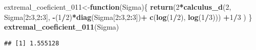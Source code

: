 \documentclass[
]{article}
\newenvironment{Shaded}{\begin{snugshade}}{\end{snugshade}}
\newcommand{\ControlFlowTok}[1]{\textcolor[rgb]{0.13,0.29,0.53}{\textbf{#1}}}
\newcommand{\DecValTok}[1]{\textcolor[rgb]{0.00,0.00,0.81}{#1}}
\newcommand{\FunctionTok}[1]{\textcolor[rgb]{0.13,0.29,0.53}{\textbf{#1}}}
\newcommand{\NormalTok}[1]{#1}
\newcommand{\OtherTok}[1]{\textcolor[rgb]{0.56,0.35,0.01}{#1}}
\newcommand{\SpecialCharTok}[1]{\textcolor[rgb]{0.81,0.36,0.00}{\textbf{#1}}}
\begin{document}
\begin{Shaded}
\begin{Highlighting}[]
\NormalTok{extremal\_coeficient\_011}\OtherTok{\textless{}{-}}\ControlFlowTok{function}\NormalTok{(Sigma)\{}
  \FunctionTok{return}\NormalTok{(}\DecValTok{2}\SpecialCharTok{*}\FunctionTok{calculus\_d}\NormalTok{(}\DecValTok{2}\NormalTok{, Sigma[}\DecValTok{2}\SpecialCharTok{:}\DecValTok{3}\NormalTok{,}\DecValTok{2}\SpecialCharTok{:}\DecValTok{3}\NormalTok{], }\SpecialCharTok{{-}}\NormalTok{(}\DecValTok{1}\SpecialCharTok{/}\DecValTok{2}\NormalTok{)}\SpecialCharTok{*}\FunctionTok{diag}\NormalTok{(Sigma[}\DecValTok{2}\SpecialCharTok{:}\DecValTok{3}\NormalTok{,}\DecValTok{2}\SpecialCharTok{:}\DecValTok{3}\NormalTok{])}\SpecialCharTok{+} \FunctionTok{c}\NormalTok{(}\FunctionTok{log}\NormalTok{(}\DecValTok{1}\SpecialCharTok{/}\DecValTok{2}\NormalTok{), }\FunctionTok{log}\NormalTok{(}\DecValTok{1}\SpecialCharTok{/}\DecValTok{3}\NormalTok{))) }\SpecialCharTok{+}\DecValTok{1}\SpecialCharTok{/}\DecValTok{3}\NormalTok{  )}
\NormalTok{\}}
\FunctionTok{extremal\_coeficient\_011}\NormalTok{(Sigma)}
\end{Highlighting}
\end{Shaded}

\begin{verbatim}
## [1] 1.555128
\end{verbatim}
\end{document}

